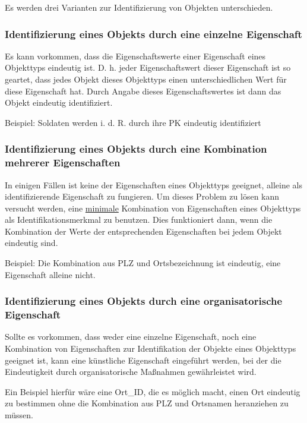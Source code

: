         Es werden drei Varianten zur Identifizierung von Objekten
        unterschieden.
        \subsubsection{Identifizierung eines Objekts durch eine einzelne
Eigenschaft}
          Es kann vorkommen, dass die Eigenschaftswerte einer Eigenschaft eines
          Objekttyps eindeutig ist. D. h. jeder Eigenschaftswert dieser
          Eigenschaft ist so geartet, dass jedes Objekt dieses Objekttyps einen
          unterschiedlichen Wert f\"ur diese Eigenschaft hat. Durch Angabe
          dieses Eigenschaftswertes ist dann das Objekt eindeutig identifiziert.

          Beispiel: Soldaten werden i. d. R. durch ihre PK eindeutig
          identifiziert

				\subsubsection{Identifizierung eines Objekts durch eine Kombination
mehrerer Eigenschaften}
          In einigen F\"allen ist keine der Eigenschaften eines Objekttyps
          geeignet, alleine als identifizierende Eigenschaft zu fungieren. Um
          dieses Problem zu l\"osen kann versucht werden, eine
          \underline{minimale} Kombination von Eigenschaften eines Objekttyps
          als Identifikationsmerkmal zu benutzen. Dies funktioniert dann, wenn
          die Kombination der Werte der entsprechenden Eigenschaften bei jedem
          Objekt eindeutig sind.

          Beispiel: Die Kombination aus PLZ und Ortsbezeichnung ist eindeutig,
					eine Eigenschaft alleine nicht.

				\subsubsection{Identifizierung eines Objekts durch eine organisatorische
Eigenschaft}
          Sollte es vorkommen, dass weder eine einzelne Eigenschaft, noch eine
					Kombination von Eigenschaften zur Identifikation der Objekte eines
					Objekttyps geeignet ist, kann eine k\"unstliche Eigenschaft
					eingef\"uhrt werden, bei der die Eindeutigkeit durch organisatorische
					Ma\ss nahmen gew\"ahrleistet wird.

					Ein Beispiel hierf\"ur w\"are eine Ort\_ID, die es m\"oglich
					macht, einen Ort eindeutig zu bestimmen ohne die Kombination aus PLZ
					und Ortsnamen heranziehen zu m\"ussen.

